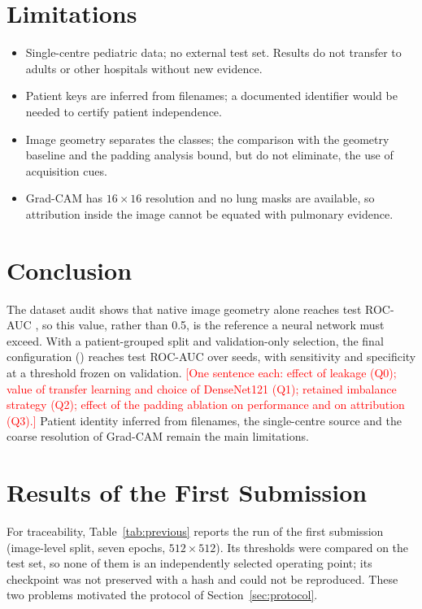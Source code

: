 \documentclass[12pt,letterpaper]{article}
\newcommand{\fillin}[1]{\textcolor{red}{[#1]}}
\begin{document}
\section{Limitations}
\label{sec:limitations}
\begin{itemize}
\item Single-centre pediatric data; no external test set. Results do not transfer to adults
or other hospitals without new evidence.
\item Patient keys are inferred from filenames; a documented identifier would be needed to
certify patient independence.
\item Image geometry separates the classes; the comparison with the geometry baseline and the
padding analysis bound, but do not eliminate, the use of acquisition cues.
\item Grad-CAM has $16\times16$ resolution and no lung masks are available, so attribution
inside the image cannot be equated with pulmonary evidence.
\end{itemize}


\section{Conclusion}
The dataset audit shows that native image geometry alone reaches test ROC-AUC \GeomTestAUC{}, so this value, rather than 0.5, is the reference a neural network must exceed. With a patient-grouped split and validation-only selection, the final configuration (\FinalName) reaches test ROC-AUC \FinalTestAUC{} over \FinalSeeds{} seeds, with sensitivity \FinalTestSens{} and specificity \FinalTestSpec{} at a threshold frozen on validation.
\fillin{One sentence each: effect of leakage (Q0); value of transfer learning and choice of DenseNet121 (Q1); retained imbalance strategy (Q2); effect of the padding ablation on performance and on attribution (Q3).}
Patient identity inferred from filenames, the single-centre source and the coarse resolution of Grad-CAM remain the main limitations.

\appendix
\section{Results of the First Submission}
\label{app:previous}
For traceability, Table~\ref{tab:previous} reports the run of the first submission
(image-level split, seven epochs, $512\times512$). Its thresholds were compared on the test set,
so none of them is an independently selected operating point; its checkpoint was not preserved
with a hash and could not be reproduced. These two problems motivated the protocol of
Section~\ref{sec:protocol}.
\end{document}
